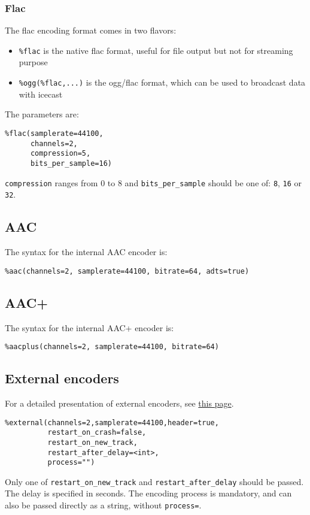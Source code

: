 \subsubsection{Flac}
The flac encoding format comes in two flavors:

\begin{itemize}
\item \verb+%flac+ is the native flac format, useful for file output but not for streaming purpose
\item \verb+%ogg(%flac,...)+ is the ogg/flac format, which can be used to broadcast data with icecast

\end{itemize}
The parameters are:

\begin{verbatim}
%flac(samplerate=44100, 
      channels=2, 
      compression=5, 
      bits_per_sample=16)
\end{verbatim}
\verb+compression+ ranges from 0 to 8 and \verb+bits_per_sample+ should be one of: \verb+8+, \verb+16+ or \verb+32+.

\subsection{AAC}
The syntax for the internal AAC encoder is:

\begin{verbatim}
%aac(channels=2, samplerate=44100, bitrate=64, adts=true)
\end{verbatim}
\subsection{AAC+}
The syntax for the internal AAC+ encoder is:

\begin{verbatim}
%aacplus(channels=2, samplerate=44100, bitrate=64)
\end{verbatim}
\subsection{External encoders}
For a detailed presentation of external encoders, see \href{external_encoders.html}{this page}.

\begin{verbatim}
%external(channels=2,samplerate=44100,header=true,
          restart_on_crash=false,
          restart_on_new_track,
          restart_after_delay=<int>,
          process="")
\end{verbatim}
Only one of \verb+restart_on_new_track+ and \verb+restart_after_delay+ should
be passed. The delay is specified in seconds.
The encoding process is mandatory, and can also be passed directly
as a string, without \verb+process=+.

